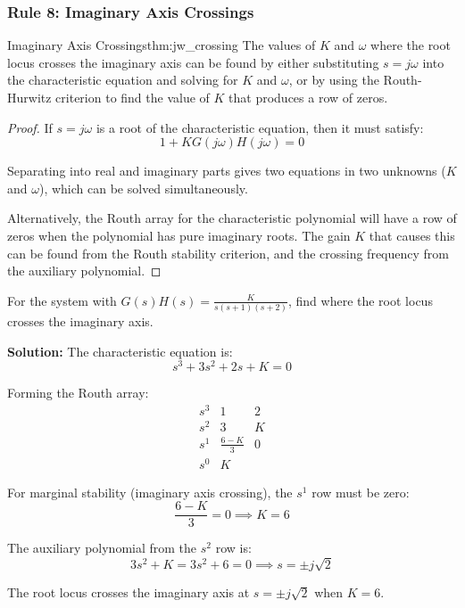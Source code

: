 \subsubsection{Rule 8: Imaginary Axis Crossings}

\begin{theorem}{Imaginary Axis Crossings}{thm:jw_crossing}
The values of $K$ and $\omega$ where the root locus crosses the imaginary axis can be found by either substituting $s = j\omega$ into the characteristic equation and solving for $K$ and $\omega$, or by using the Routh-Hurwitz criterion to find the value of $K$ that produces a row of zeros.
\end{theorem}

\begin{proof}
If $s = j\omega$ is a root of the characteristic equation, then it must satisfy:
\[
1 + KG(j\omega)H(j\omega) = 0
\]

Separating into real and imaginary parts gives two equations in two unknowns ($K$ and $\omega$), which can be solved simultaneously.

Alternatively, the Routh array for the characteristic polynomial will have a row of zeros when the polynomial has pure imaginary roots. The gain $K$ that causes this can be found from the Routh stability criterion, and the crossing frequency from the auxiliary polynomial.
\end{proof}

\begin{examplebox}
\label{ex:jw_cross}
For the system with $G(s)H(s) = \frac{K}{s(s+1)(s+2)}$, find where the root locus crosses the imaginary axis.

\textbf{Solution:} The characteristic equation is:
\[
s^3 + 3s^2 + 2s + K = 0
\]

Forming the Routh array:
\[
\begin{array}{c|cc}
s^3 & 1 & 2 \\
s^2 & 3 & K \\
s^1 & \frac{6-K}{3} & 0 \\
s^0 & K &
\end{array}
\]

For marginal stability (imaginary axis crossing), the $s^1$ row must be zero:
\[
\frac{6-K}{3} = 0 \implies K = 6
\]

The auxiliary polynomial from the $s^2$ row is:
\[
3s^2 + K = 3s^2 + 6 = 0 \implies s = \pm j\sqrt{2}
\]

The root locus crosses the imaginary axis at $s = \pm j\sqrt{2}$ when $K = 6$.
\end{examplebox}

